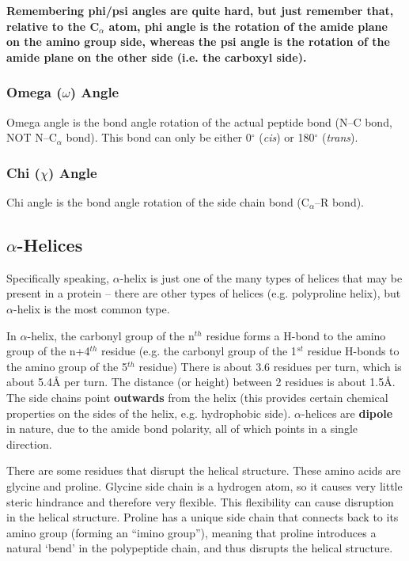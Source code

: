 \noindent
\textbf{Remembering phi/psi angles are quite hard, but just remember that, relative to the C$_{\alpha}$ atom, phi angle is the rotation of the amide plane on the amino group side, whereas the psi angle is the rotation of the amide plane on the other side (i.e. the carboxyl side).}

\subsubsection{Omega ($\omega$) Angle}

Omega angle is the bond angle rotation of the actual peptide bond (N--C bond, NOT N--C$_{\alpha}$ bond).
This bond can only be either 0$^{\circ}$ (\textit{cis}) or 180$^{\circ}$ (\textit{trans}).

\subsubsection{Chi ($\chi$) Angle}

Chi angle is the bond angle rotation of the side chain bond (C$_{\alpha}$--R bond).

\subsection{$\alpha$-Helices}

Specifically speaking, $\alpha$-helix is just one of the many types of helices that may be present in a protein -- there are other types of helices (e.g. polyproline helix), but $\alpha$-helix is the most common type.

In $\alpha$-helix, the carbonyl group of the n$^{th}$ residue forms a H-bond to the amino group of the n+4$^{th}$ residue (e.g. the carbonyl group of the 1$^{st}$ residue H-bonds to the amino group of the 5$^{th}$ residue)
There is about 3.6 residues per turn, which is about 5.4\AA{} per turn.
The distance (or height) between 2 residues is about 1.5\AA.
The side chains point \textbf{outwards} from the helix (this provides certain chemical properties on the sides of the helix, e.g. hydrophobic side).
$\alpha$-helices are \textbf{dipole} in nature, due to the amide bond polarity, all of which points in a single direction.

There are some residues that disrupt the helical structure.
These amino acids are glycine and proline.
Glycine side chain is a hydrogen atom, so it causes very little steric hindrance and therefore very flexible.
This flexibility can cause disruption in the helical structure.
Proline has a unique side chain that connects back to its amino group (forming an ``imino group''), meaning that proline introduces a natural `bend' in the polypeptide chain, and thus disrupts the helical structure.

